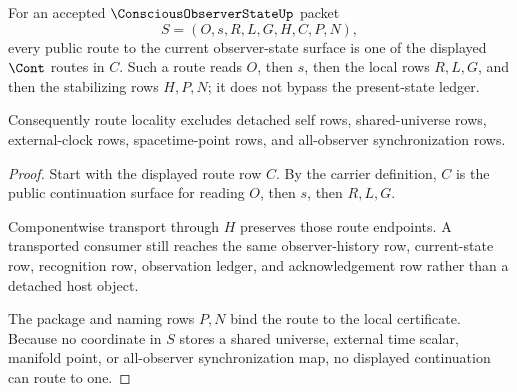 \begin{theorem}
\label{thm:conscious-observer-state-route-locality}
For an accepted $\ConsciousObserverStateUp$ packet
$$
S=(O,s,R,L,G,H,C,P,N),
$$
every public route to the current observer-state surface is one of the displayed $\Cont$ routes in $C$. Such a route reads $O$, then $s$, then the local rows $R,L,G$, and then the stabilizing rows $H,P,N$; it does not bypass the present-state ledger.

Consequently route locality excludes detached self rows, shared-universe rows, external-clock rows, spacetime-point rows, and all-observer synchronization rows.
\end{theorem}
\begin{proof}
Start with the displayed route row $C$. By the carrier definition, $C$ is the public continuation surface for reading $O$, then $s$, then $R,L,G$.

Componentwise transport through $H$ preserves those route endpoints. A transported consumer still reaches the same observer-history row, current-state row, recognition row, observation ledger, and acknowledgement row rather than a detached host object.

The package and naming rows $P,N$ bind the route to the local certificate. Because no coordinate in $S$ stores a shared universe, external time scalar, manifold point, or all-observer synchronization map, no displayed continuation can route to one.
\end{proof}


